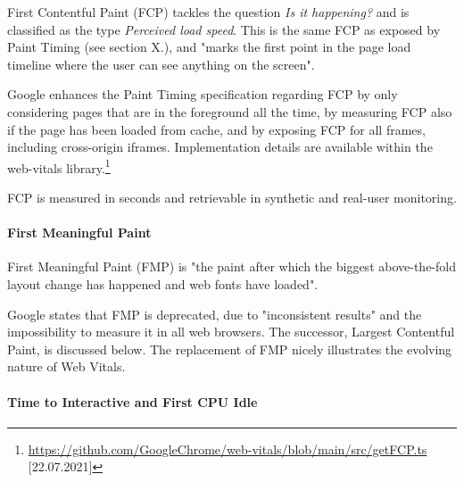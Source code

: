 First Contentful Paint (FCP) tackles the question \textit{Is it happening?} and is classified as the type \textit{Perceived load speed}.
This is the same FCP as exposed by Paint Timing (see section X.), and "marks the first point in the page load timeline where the user can see anything on the screen". %

Google enhances the Paint Timing specification regarding FCP by only considering pages that are in the foreground all the time,
by measuring FCP also if the page has been loaded from cache, and by exposing FCP for all frames, including cross-origin iframes.
Implementation details are available within the web-vitals library.\footnote{\url{https://github.com/GoogleChrome/web-vitals/blob/main/src/getFCP.ts} [22.07.2021]}

FCP is measured in seconds and retrievable in synthetic and real-user monitoring.






\paragraph{First Meaningful Paint}

First Meaningful Paint (FMP) is "the paint after which the biggest above-the-fold layout change has happened and web fonts have loaded". %

Google states that FMP is deprecated, due to "inconsistent results" and the impossibility to measure it in all web browsers. %
The successor, Largest Contentful Paint, is discussed below.
The replacement of FMP nicely illustrates the evolving nature of Web Vitals.







\paragraph{Time to Interactive and First CPU Idle}

